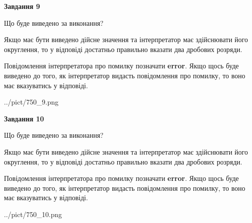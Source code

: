 \documentclass[12pt, ukrainian]{article}
\begin{document}
{\begin {Large}
{\begin {center}\textbf{Завдання 9}\end {center}}\par
Що буде виведено за виконання? \par

Якщо має бути виведено дійсне значення та інтерпретатор має здійснювати його округлення, 
то у відповіді достатньо правильно вказати два дробових розряди.

Повідомлення інтерпретатора про помилку позначати \textbf{error}.
Якщо щось буде виведено до того, як інтерпретатор видасть повідомлення про помилку, 
то воно має вказуватись у відповіді. \par

\begin{center}
	{../pict/750_9.png}
\end{center}
\newpage

{\begin {center}\textbf{Завдання 10}\end {center}}\par
Що буде виведено за виконання? \par

Якщо має бути виведено дійсне значення та інтерпретатор має здійснювати його округлення, 
то у відповіді достатньо правильно вказати два дробових розряди.

Повідомлення інтерпретатора про помилку позначати \textbf{error}.
Якщо щось буде виведено до того, як інтерпретатор видасть повідомлення про помилку, 
то воно має вказуватись у відповіді. \par

\begin{center}
	{../pict/750_10.png}
\end{center}
\newpage

\end {Large}}
\end{document}

